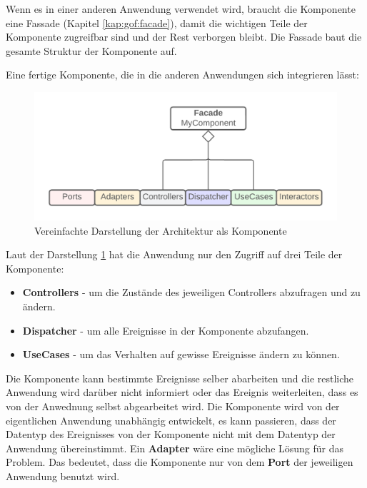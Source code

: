 \newpage
Wenn es in einer anderen Anwendung verwendet wird, braucht die Komponente eine Fassade (Kapitel \ref{kap:gof:facade}), damit 
die wichtigen Teile der Komponente zugreifbar sind und der Rest verborgen bleibt. 
Die Fassade baut die gesamte Struktur der Komponente auf.

Eine fertige Komponente, die in die anderen Anwendungen sich integrieren lässt:

\begin{figure}[H]
    \centering
    \includegraphics[width=1\textwidth]{./images/Architecture as Facade.png}
    \caption{Vereinfachte Darstellung der Architektur als Komponente}
    \label{fig:SimpliedArchitectureAsKomponent}
\end{figure}

Laut der Darstellung \ref{fig:SimpliedArchitectureAsKomponent} hat die Anwendung nur den Zugriff auf drei Teile der Komponente:
\begin{itemize}
    \item \textbf{Controllers} - um die Zustände des jeweiligen Controllers abzufragen und zu ändern.
    \item \textbf{Dispatcher} - um alle Ereignisse in der Komponente abzufangen.
    \item \textbf{UseCases} - um das Verhalten auf gewisse Ereignisse ändern zu können.
\end{itemize}

Die Komponente kann bestimmte Ereignisse selber abarbeiten und die restliche Anwendung wird darüber nicht informiert oder
das Ereignis weiterleiten, dass es von der Anwednung selbst abgearbeitet wird.
Die Komponente wird von der eigentlichen Anwendung unabhängig entwickelt, es kann passieren, dass
der Datentyp des Ereignisses von der Komponente nicht mit dem Datentyp der Anwendung übereinstimmt. 
Ein \textbf{Adapter} wäre eine mögliche Lösung für das Problem.
Das bedeutet, dass die Komponente nur von dem \textbf{Port} der jeweiligen Anwendung benutzt wird.

